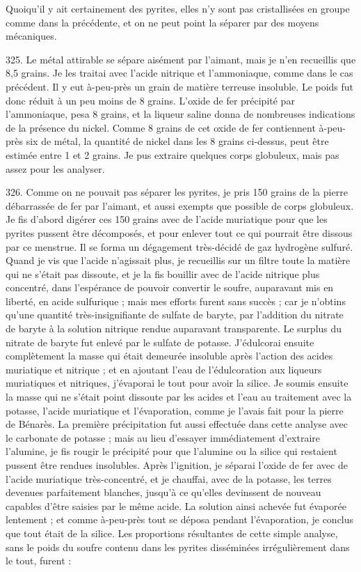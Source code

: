 \documentclass[a4paper, 11pt, oneside, polutonikogreek, french]{article}
\begin{document}
Quoiqu'il y ait certainement des pyrites, elles n'y sont pas cristallisées en groupe comme dans la précédente, et on ne peut point la séparer par des moyens mécaniques.

325. Le métal attirable se sépare aisément par l'aimant, mais je n'en recueillis que 8,5 grains. Je les traitai avec l'acide nitrique et l'ammoniaque, comme dans le cas précédent. Il y eut à-peu-près un grain de matière terreuse insoluble. Le poids fut donc réduit à un peu moins de 8 grains. L'oxide de fer précipité par l'ammoniaque, pesa 8 grains, et la liqueur saline donna de nombreuses indications de la présence du nickel. Comme 8 grains de cet oxide de fer contiennent à-peu-près six de métal, la quantité de nickel dans les 8 grains ci-dessus, peut être estimée entre 1 et 2 grains. Je pus extraire quelques corps globuleux, mais pas assez pour les analyser.

326. Comme on ne pouvait pas séparer les pyrites, je pris 150 grains de la pierre débarrassée de fer par l'aimant, et aussi exempts que possible de corps globuleux. Je fis d'abord digérer ces 150 grains avec de l'acide muriatique pour que les pyrites pussent être décomposés, et pour enlever tout ce qui pourrait être dissous par ce menstrue. Il se forma un dégagement très-décidé de gaz hydrogène sulfuré. Quand je vis que l'acide n'agissait plus, je recueillis sur un filtre toute la matière qui ne s'était pas dissoute, et je la fis bouillir avec de l'acide nitrique plus concentré, dans l'espérance de pouvoir convertir le soufre, auparavant mis en liberté, en acide sulfurique ; mais mes efforts furent sans succès ; car je n'obtins qu'une quantité très-insignifiante de sulfate de baryte, par l'addition du nitrate de baryte à la solution nitrique rendue auparavant transparente. Le surplus du nitrate de baryte fut enlevé par le sulfate de potasse. J'édulcorai ensuite complètement la masse qui était demeurée insoluble après l'action des acides muriatique et nitrique ; et en ajoutant l'eau de l'édulcoration aux liqueurs muriatiques et nitriques, j'évaporai le tout pour avoir la silice. Je soumis ensuite la masse qui ne s'était point dissoute par les acides et l'eau au traitement avec la potasse, l'acide muriatique et l'évaporation, comme je l'avais fait pour la pierre de Bénarès. La première précipitation fut aussi effectuée dans cette analyse avec le carbonate de potasse ; mais au lieu d'essayer immédiatement d'extraire l'alumine, je fis rougir le précipité pour que l'alumine ou la silice qui restaient pussent être rendues insolubles. Après l'ignition, je séparai l'oxide de fer avec de l'acide muriatique très-concentré, et je chauffai, avec de la potasse, les terres devenues parfaitement blanches, jusqu'à ce qu'elles devinssent de nouveau capables d'être saisies par le même acide. La solution ainsi achevée fut évaporée lentement ; et comme à-peu-près tout se déposa pendant l'évaporation, je conclus que tout était de la silice. Les proportions résultantes de cette simple analyse, sans le poids du soufre contenu dans les pyrites disséminées irrégulièrement dans le tout, furent :
\end{document}

